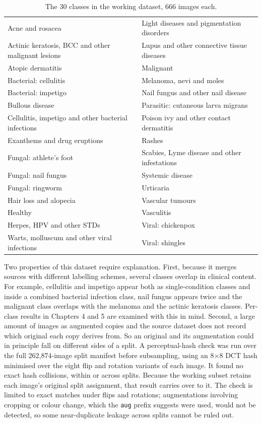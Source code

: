 \documentclass[12pt,openany,a4paper]{book}
\begin{document}
\begin{table}[H]
  \centering
  \caption{The 30 classes in the working dataset, 666 images each.}
  \label{tab:classes}
  \small
  \begin{tabular}{ll}
    \hline
    Acne and rosacea & Light diseases and pigmentation disorders \\
    Actinic keratosis, BCC and other malignant lesions & Lupus and other connective tissue diseases \\
    Atopic dermatitis & Malignant \\
    Bacterial: cellulitis & Melanoma, nevi and moles \\
    Bacterial: impetigo & Nail fungus and other nail disease \\
    Bullous disease & Parasitic: cutaneous larva migrans \\
    Cellulitis, impetigo and other bacterial infections & Poison ivy and other contact dermatitis \\
    Exanthems and drug eruptions & Rashes \\
    Fungal: athlete's foot & Scabies, Lyme disease and other infestations \\
    Fungal: nail fungus & Systemic disease \\
    Fungal: ringworm & Urticaria \\
    Hair loss and alopecia & Vascular tumours \\
    Healthy & Vasculitis \\
    Herpes, HPV and other STDs & Viral: chickenpox \\
    Warts, molluscum and other viral infections & Viral: shingles \\
    \hline
  \end{tabular}
\end{table}

Two properties of this dataset require explanation. First, because it merges sources with different labelling schemes, several classes overlap in clinical content. For example, cellulitis and impetigo appear both as single-condition classes and inside a combined bacterial infection class, nail fungus appears twice and the malignant class overlaps with the melanoma and the actinic keratosis classes. Per-class results in Chapters 4 and 5 are examined with this in mind. Second, a large amount of images as augmented copies and the source dataset does not record which original each copy derives from. So an original and its augmentation could in principle fall on different sides of a split. A perceptual-hash check was run over the full 262,874-image split manifest before subsampling, using an 8$\times$8 DCT hash minimised over the eight flip and rotation variants of each image. It found no exact hash collisions, within or across splits. Because the working subset retains each image's original split assignment, that result carries over to it. The check is limited to exact matches under flips and rotations; augmentations involving cropping or colour change, which the \texttt{aug} prefix suggests were used, would not be detected, so some near-duplicate leakage across splits cannot be ruled out.
\end{document}
